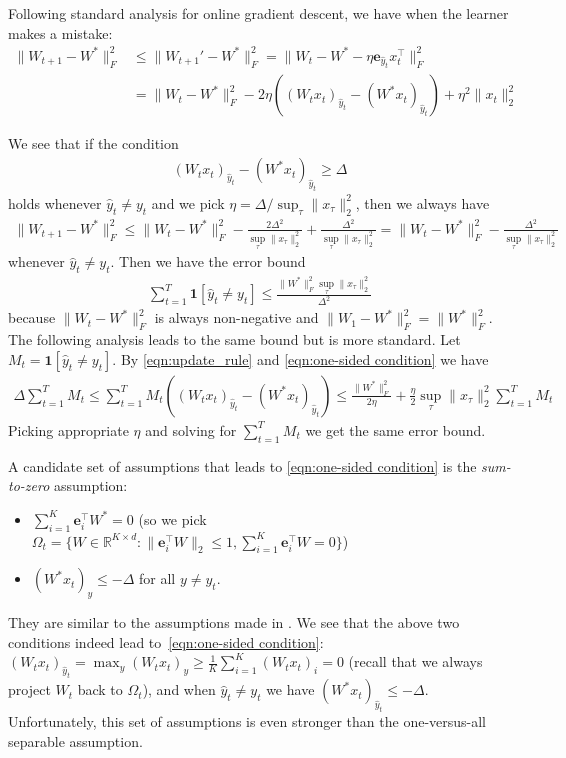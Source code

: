\documentclass{article}
\newcommand{\one}{\boldsymbol{1}}
\newcommand{\e}{\mathbf{e}}
\begin{document}
Following standard analysis for online gradient descent, we have when the learner makes a mistake:
\begin{align}
    \|W_{t+1}-W^*\|_F^2 &\leq \|W_{t+1}'-W^*\|_F^2 = \|W_t - W^* - \eta \e_{\hat{y}_t}x_t^\top \|_F^2 \nonumber \\
    &= \|W_t-W^*\|_F^2 - 2\eta ((W_tx_t)_{\hat{y}_t} - (W^*x_t)_{\hat{y}_t}) + \eta^2\|x_t\|_2^2 
    \label{eqn:update_rule}
\end{align}

We see that if the condition 
\begin{align}
    (W_tx_t)_{\hat{y}_t} - (W^*x_t)_{\hat{y}_t} \geq \Delta  \label{eqn:one-sided condition}
\end{align}
holds whenever $\hat{y}_t\neq y_t$ and we pick $\eta = \Delta/\sup_\tau\|x_\tau\|_2^2$, then we always have
\begin{align*}
    \|W_{t+1}-W^*\|_F^2 \leq \|W_{t}-W^*\|_F^2 -\frac{2\Delta^2}{\sup_\tau\|x_\tau\|_2^2} + \frac{\Delta^2}{\sup_\tau\|x_\tau\|_2^2} = \|W_{t}-W^*\|_F^2 - \frac{\Delta^2}{\sup_\tau\|x_\tau\|_2^2} 
\end{align*}
whenever $\hat{y}_t\neq y_t$. Then we have the error bound 
\begin{align*}
    \sum_{t=1}^T \one[\hat{y}_t\neq y_t] \leq \frac{\|W^*\|_F^2 \sup_{\tau}\|x_\tau\|_2^2}{\Delta^2}   
\end{align*}
because $\|W_t - W^*\|_F^2$ is always non-negative and $\|W_1-W^*\|_F^2=\|W^*\|_F^2$. \\

The following analysis leads to the same bound but is more standard. Let $M_t=\one[\hat{y}_t\neq y_t]$. By \eqref{eqn:update_rule} and \eqref{eqn:one-sided condition} we have
\begin{align*}
    \Delta \sum_{t=1}^T M_t  \leq \sum_{t=1}^T M_t\left((W_tx_t)_{\hat{y}_t} - (W^*x_t)_{\hat{y}_t}\right) \leq \frac{\|W^*\|_F^2}{2\eta} + \frac{\eta}{2}\sup_\tau\|x_\tau\|_2^2\sum_{t=1}^T M_t
\end{align*}
Picking appropriate $\eta$ and solving for $\sum_{t=1}^T M_t$ we get the same error bound. 


A candidate set of assumptions that leads to \eqref{eqn:one-sided condition} is the \textit{sum-to-zero} assumption: 
\begin{itemize}
    \item $\sum_{i=1}^K \e_i^\top W^* = 0$ (so we pick $\Omega_t = \{W\in \mathbb{R}^{K\times d}: \|\e_i^\top W\|_2\leq 1, \sum_{i=1}^K \e_i^\top W=0\}$) \\
    \item $ (W^*x_t)_y \leq -\Delta $ for all $y\neq y_t$. 
\end{itemize}
They are similar to the assumptions made in \cite{2018arXiv180610745F}. We see that the above two conditions indeed lead to~\eqref{eqn:one-sided condition}: $(W_tx_t)_{\hat{y}_t} = \max_y (W_tx_t)_y \geq \frac{1}{K}\sum_{i=1}^K (W_tx_t)_i =0 $ (recall that we always project $W_t$ back to $\Omega_t$), and when $\hat{y}_t\neq y_t$ we have $(W^*x_t)_{\hat{y}_t}\leq -\Delta$. Unfortunately, this set of assumptions is even stronger than the one-versus-all separable assumption. 
\end{document}
